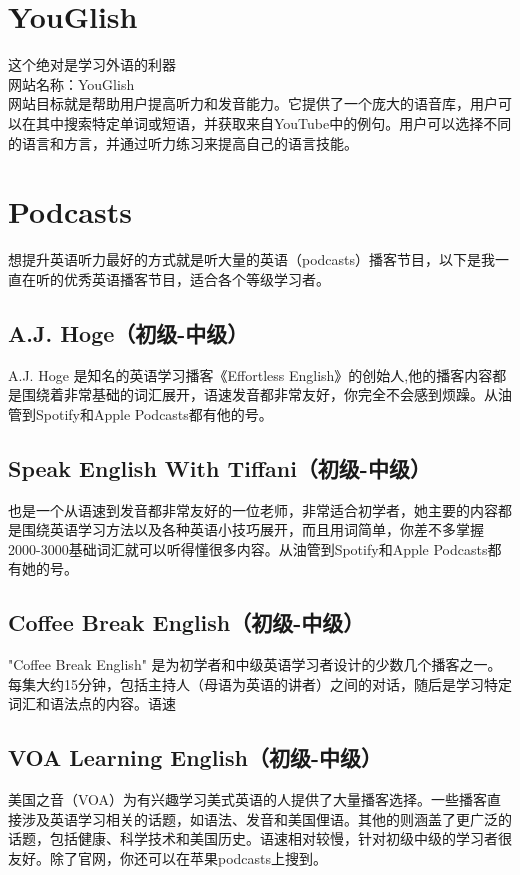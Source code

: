 \documentclass[11pt]{article}
\begin{document}
\section{YouGlish}
\label{sec:org6ca4185}
这个绝对是学习外语的利器 \\
网站名称：YouGlish \\
网站目标就是帮助用户提高听力和发音能力。它提供了一个庞大的语音库，用户可以在其中搜索特定单词或短语，并获取来自YouTube中的例句。用户可以选择不同的语言和方言，并通过听力练习来提高自己的语言技能。\\


\section{Podcasts}
\label{sec:org4a6b54d}
想提升英语听力最好的方式就是听大量的英语（podcasts）播客节目，以下是我一直在听的优秀英语播客节目，适合各个等级学习者。

\subsection{A.J. Hoge（初级-中级）}
\label{sec:orgbada5df}
A.J. Hoge 是知名的英语学习播客《Effortless English》的创始人,他的播客内容都是围绕着非常基础的词汇展开，语速发音都非常友好，你完全不会感到烦躁。从油管到Spotify和Apple Podcasts都有他的号。
\subsection{Speak English With Tiffani（初级-中级）}
\label{sec:orgd844d8d}
也是一个从语速到发音都非常友好的一位老师，非常适合初学者，她主要的内容都是围绕英语学习方法以及各种英语小技巧展开，而且用词简单，你差不多掌握2000-3000基础词汇就可以听得懂很多内容。从油管到Spotify和Apple Podcasts都有她的号。

\subsection{Coffee Break English（初级-中级）}
\label{sec:org0c8d63e}
"Coffee Break English" 是为初学者和中级英语学习者设计的少数几个播客之一。每集大约15分钟，包括主持人（母语为英语的讲者）之间的对话，随后是学习特定词汇和语法点的内容。语速

\subsection{VOA Learning English（初级-中级）}
\label{sec:org3fb52d1}
美国之音（VOA）为有兴趣学习美式英语的人提供了大量播客选择。一些播客直接涉及英语学习相关的话题，如语法、发音和美国俚语。其他的则涵盖了更广泛的话题，包括健康、科学技术和美国历史。语速相对较慢，针对初级中级的学习者很友好。除了官网，你还可以在苹果podcasts上搜到。
\end{document}
